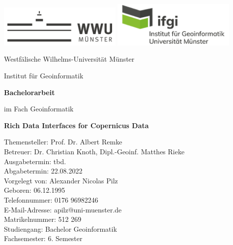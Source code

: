 \documentclass[12pt, a4paper]{article} %
\begin{document}
\lstset{
    frame       = single,
    numbers     = left,
    showspaces  = false,
    showstringspaces    = false,
    captionpos  = t,
    caption     = \section,
    tabsize         = 2,
    numberstyle     = \tiny,
    firstnumber=1
}

\thispagestyle{empty}
\begin{center}
\includegraphics[width=6cm]{Bilder/wwu_logo.png} \hspace{1.3cm} 
\includegraphics[width=6cm]{Bilder/ifgi_logo.png}

\vspace{3cm}

Westfälische Wilhelms-Universität Münster

Institut für Geoinformatik 

\vspace{3cm}

\textbf{\large Bachelorarbeit} 

im Fach Geoinformatik
\vspace{1cm}

\textbf{\large Rich Data Interfaces for Copernicus Data}

\vspace{1cm}

Themensteller: Prof. Dr. Albert Remke\\
Betreuer: Dr. Christian Knoth, Dipl.-Geoinf. Matthes Rieke\\
Ausgabetermin: tbd.\\
Abgabetermin: 22.08.2022\\
\vspace{0.5cm}
Vorgelegt von: Alexander Nicolas Pilz\\
Geboren: 06.12.1995\\
Telefonnummer: 0176 96982246\\
E-Mail-Adresse:	apilz@uni-muenster.de\\
Matrikelnummer: 512 269\\
Studiengang: Bachelor Geoinformatik\\
Fachsemester: 6. Semester\\

\end{center}
\newpage
\tableofcontents 
\newpage
\listoffigures
\listoftables
\newpage

\end{document}
